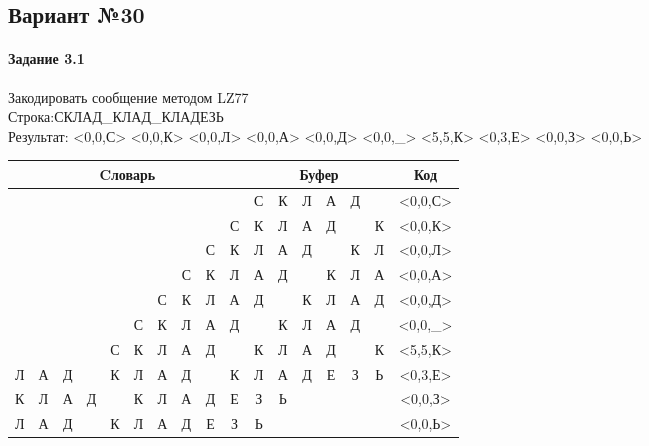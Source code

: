 \documentclass[a4paper, 12pt]{article}
\begin{document}
\pagebreak
\subsection{Вариант №30}
\paragraph{Задание 3.1}

Закодировать сообщение методом LZ77\\
Строка:СКЛАД\_КЛАД\_КЛАДЕЗЬ\\
Результат: <0,0,С> <0,0,К> <0,0,Л> <0,0,А> <0,0,Д> <0,0,\_> <5,5,К> <0,3,Е> <0,0,З> <0,0,Ь>\\
\begin{table}[h!]
\centering
\begin{tabular}{|c|c|c|c|c|c|c|c|c|c|c|c|c|c|c|c|c|} 
\hline
\multicolumn{10}{|c|}{Cловарь} & \multicolumn{6}{c|}{Буфер} & Код  \\ \hline
  &   &   &   &   &   &   &   &   &   & \cellcolor[HTML]{8CE4F6} С & К & Л & А & Д &   & <0,0,С>
\\ \hline
  &   &   &   &   &   &   &   &   & С & \cellcolor[HTML]{8CE4F6} К & Л & А & Д &   & К & <0,0,К>
\\ \hline
  &   &   &   &   &   &   &   & С & К & \cellcolor[HTML]{8CE4F6} Л & А & Д &   & К & Л & <0,0,Л>
\\ \hline
  &   &   &   &   &   &   & С & К & Л & \cellcolor[HTML]{8CE4F6} А & Д &   & К & Л & А & <0,0,А>
\\ \hline
  &   &   &   &   &   & С & К & Л & А & \cellcolor[HTML]{8CE4F6} Д &   & К & Л & А & Д & <0,0,Д>
\\ \hline
  &   &   &   &   & С & К & Л & А & Д & \cellcolor[HTML]{8CE4F6}   & К & Л & А & Д &   & <0,0,\_>
\\ \hline
  &   &   &   & С & \cellcolor[HTML]{FFFF00} К & \cellcolor[HTML]{FFFF00} Л & \cellcolor[HTML]{FFFF00} А & \cellcolor[HTML]{FFFF00} Д & \cellcolor[HTML]{FFFF00}   & \cellcolor[HTML]{FFFF00} К & \cellcolor[HTML]{FFFF00} Л & \cellcolor[HTML]{FFFF00} А & \cellcolor[HTML]{FFFF00} Д & \cellcolor[HTML]{FFFF00}   & \cellcolor[HTML]{8CE4F6} К & <5,5,К>
\\ \hline
\cellcolor[HTML]{FFFF00} Л & \cellcolor[HTML]{FFFF00} А & \cellcolor[HTML]{FFFF00} Д &   & К & Л & А & Д &   & К & \cellcolor[HTML]{FFFF00} Л & \cellcolor[HTML]{FFFF00} А & \cellcolor[HTML]{FFFF00} Д & \cellcolor[HTML]{8CE4F6} Е & З & Ь & <0,3,Е>
\\ \hline
К & Л & А & Д &   & К & Л & А & Д & Е & \cellcolor[HTML]{8CE4F6} З & Ь &   &   &   &   & <0,0,З>
\\ \hline
Л & А & Д &   & К & Л & А & Д & Е & З & \cellcolor[HTML]{8CE4F6} Ь &   &   &   &   &   & <0,0,Ь>
\\ \hline
\end{tabular}
\end{table}
\end{document}
